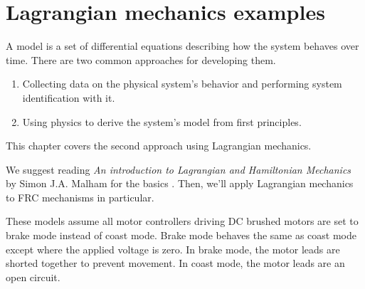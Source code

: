 
\chapter{Lagrangian mechanics examples}

A \gls{model} is a set of differential equations describing how the \gls{system}
behaves over time. There are two common approaches for developing them.
\begin{enumerate}
  \item Collecting data on the physical system's behavior and performing
    \gls{system} identification with it.
  \item Using physics to derive the \gls{system}'s model from first principles.
\end{enumerate}

This chapter covers the second approach using Lagrangian mechanics.

We suggest reading \textit{An introduction to Lagrangian and Hamiltonian
Mechanics} by Simon J.A. Malham for the basics
\cite{bib:an_intro_to_lagrangian_and_hamiltonian_mechanics}. Then, we'll apply
Lagrangian mechanics to FRC mechanisms in particular.

These \glspl{model} assume all motor controllers driving DC brushed motors are
set to brake mode instead of coast mode. Brake mode behaves the same as coast
mode except where the applied voltage is zero. In brake mode, the motor leads
are shorted together to prevent movement. In coast mode, the motor leads are an
open circuit.

\renewcommand*{\chapterpath}{\partpath/lagrangian-mechanics-examples}


